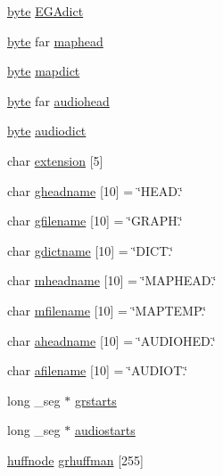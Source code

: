 \begin{DoxyCompactItemize}
\item 
\hyperlink{ID__HEAD_8H_a0c8186d9b9b7880309c27230bbb5e69d}{byte} \hyperlink{ID__CA_8C_adbe333a4416576b70774726085637281}{EGAdict}
\item 
\hyperlink{ID__HEAD_8H_a0c8186d9b9b7880309c27230bbb5e69d}{byte} far \hyperlink{ID__CA_8C_a472b90622a8d5fc66c491bf032d769d2}{maphead}
\item 
\hyperlink{ID__HEAD_8H_a0c8186d9b9b7880309c27230bbb5e69d}{byte} \hyperlink{ID__CA_8C_aa09440af5bcf6e89898468325f86c2dd}{mapdict}
\item 
\hyperlink{ID__HEAD_8H_a0c8186d9b9b7880309c27230bbb5e69d}{byte} far \hyperlink{ID__CA_8C_ab3779f97bce2b6a9ff59f713c69e7b63}{audiohead}
\item 
\hyperlink{ID__HEAD_8H_a0c8186d9b9b7880309c27230bbb5e69d}{byte} \hyperlink{ID__CA_8C_a8b8b45705a31b3dea9459d4c4aadb0d3}{audiodict}
\item 
char \hyperlink{ID__CA_8C_ab39923c10c51a08b6520566a47b307b5}{extension} \mbox{[}5\mbox{]}
\item 
char \hyperlink{ID__CA_8C_acc0b8597a65fbc2db1d9085f2155322f}{gheadname} \mbox{[}10\mbox{]} = \char`\"{}HEAD.\char`\"{}
\item 
char \hyperlink{ID__CA_8C_a7c0f9e79b593ea1e4b4c11eb3f453441}{gfilename} \mbox{[}10\mbox{]} = \char`\"{}GRAPH.\char`\"{}
\item 
char \hyperlink{ID__CA_8C_a33eb86aadf8d284b465028ee5c9fbbc0}{gdictname} \mbox{[}10\mbox{]} = \char`\"{}DICT.\char`\"{}
\item 
char \hyperlink{ID__CA_8C_ad22a6c11e49c368ace6f3aca1057b21d}{mheadname} \mbox{[}10\mbox{]} = \char`\"{}MAPHEAD.\char`\"{}
\item 
char \hyperlink{ID__CA_8C_aed11d164b12fd19ca11fee978f42673d}{mfilename} \mbox{[}10\mbox{]} = \char`\"{}MAPTEMP.\char`\"{}
\item 
char \hyperlink{ID__CA_8C_ae27bc3abca3350509677eede2aa0f32a}{aheadname} \mbox{[}10\mbox{]} = \char`\"{}AUDIOHED.\char`\"{}
\item 
char \hyperlink{ID__CA_8C_ac7fd0efffc3b41d475ede3556547646a}{afilename} \mbox{[}10\mbox{]} = \char`\"{}AUDIOT.\char`\"{}
\item 
long \_\-seg $\ast$ \hyperlink{ID__CA_8C_a9a8af7c3aff26b9be0edd764efef3bba}{grstarts}
\item 
long \_\-seg $\ast$ \hyperlink{ID__CA_8C_aca24eee9c13114cc6f73c094c7eb9379}{audiostarts}
\item 
\hyperlink{structhuffnode}{huffnode} \hyperlink{ID__CA_8C_a7c84a882b31be31f96afa20526b740d4}{grhuffman} \mbox{[}255\mbox{]}

\end{DoxyCompactItemize}
